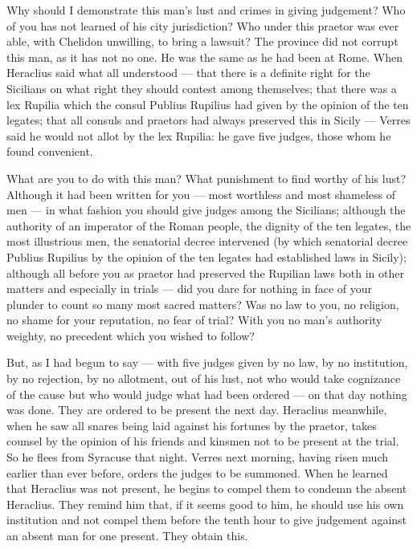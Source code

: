  Why should I demonstrate this man's lust and crimes in giving judgement? Who of you has not learned of his city jurisdiction? Who under this praetor was ever able, with Chelidon unwilling, to bring a lawsuit? The province did not corrupt this man, as it has not no one. He was the same as he had been at Rome. When Heraclius said what all understood --- that there is a definite right for the Sicilians on what right they should contest among themselves; that there was a lex Rupilia which the consul Publius Rupilius had given by the opinion of the ten legates; that all consuls and praetors had always preserved this in Sicily --- Verres said he would not allot by the lex Rupilia: he gave five judges, those whom he found convenient.

 What are you to do with this man? What punishment to find worthy of his lust? Although it had been written for you --- most worthless and most shameless of men --- in what fashion you should give judges among the Sicilians; although the authority of an imperator of the Roman people, the dignity of the ten legates, the most illustrious men, the senatorial decree intervened (by which senatorial decree Publius Rupilius by the opinion of the ten legates had established laws in Sicily); although all before you as praetor had preserved the Rupilian laws both in other matters and especially in trials --- did you dare for nothing in face of your plunder to count so many most sacred matters? Was no law to you, no religion, no shame for your reputation, no fear of trial? With you no man's authority weighty, no precedent which you wished to follow?

 But, as I had begun to say --- with five judges given by no law, by no institution, by no rejection, by no allotment, out of his lust, not who would take cognizance of the cause but who would judge what had been ordered --- on that day nothing was done. They are ordered to be present the next day. Heraclius meanwhile, when he saw all snares being laid against his fortunes by the praetor, takes counsel by the opinion of his friends and kinsmen not to be present at the trial. So he flees from Syracuse that night. Verres next morning, having risen much earlier than ever before, orders the judges to be summoned. When he learned that Heraclius was not present, he begins to compel them to condemn the absent Heraclius. They remind him that, if it seems good to him, he should use his own institution and not compel them before the tenth hour to give judgement against an absent man for one present. They obtain this.

